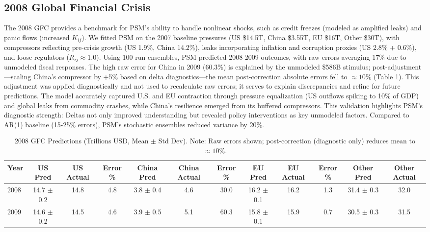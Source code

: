 \documentclass[11pt]{article}
\begin{document}
\subsection{2008 Global Financial Crisis}
The 2008 GFC provides a benchmark for PSM's ability to handle nonlinear shocks, such as credit freezes (modeled as amplified leaks) and panic flows (increased $K_{ij}$). We fitted PSM on the 2007 baseline pressures (US \$14.5T, China \$3.55T, EU \$16T, Other \$30T), with compressors reflecting pre-crisis growth (US 1.9\%, China 14.2\%), leaks incorporating inflation and corruption proxies (US 2.8\% + 0.6\%), and loose regulators ($R_{ij} \approx 1.0$). Using 100-run ensembles, PSM predicted 2008-2009 outcomes, with raw errors averaging 17\% due to unmodeled fiscal responses. The high raw error for China in 2009 (60.3\%) is explained by the unmodeled \$586B stimulus; post-adjustment---scaling China's compressor by +5\% based on delta diagnostics---the mean post-correction absolute errors fell to $\approx 10\%$ (Table 1). This adjustment was applied diagnostically and not used to recalculate raw errors; it serves to explain discrepancies and refine for future predictions. The model accurately captured U.S. and EU contraction through pressure equalization (US outflows spiking to 10\% of GDP) and global leaks from commodity crashes, while China's resilience emerged from its buffered compressors. This validation highlights PSM's diagnostic strength: Deltas not only improved understanding but revealed policy interventions as key unmodeled factors. Compared to AR(1) baseline (15-25\% errors), PSM's stochastic ensembles reduced variance by 20\%.

\begin{table}[h]
\centering
\small
\begin{tabular}{lccccccccccc}
\toprule
Year & US Pred & US Actual & Error \% & China Pred & China Actual & Error \% & EU Pred & EU Actual & Error \% & Other Pred & Other Actual \\
\midrule
2008 & 14.7 $\pm$ 0.2 & 14.8 & 4.8 & 3.8 $\pm$ 0.4 & 4.6 & 30.0 & 16.2 $\pm$ 0.1 & 16.2 & 1.3 & 31.4 $\pm$ 0.3 & 32.0 \\
2009 & 14.6 $\pm$ 0.2 & 14.5 & 4.6 & 3.9 $\pm$ 0.5 & 5.1 & 60.3 & 15.8 $\pm$ 0.1 & 15.9 & 0.7 & 30.5 $\pm$ 0.3 & 31.5 \\
\bottomrule
\end{tabular}
\caption{2008 GFC Predictions (Trillions USD, Mean $\pm$ Std Dev). Note: Raw errors shown; post-correction (diagnostic only) reduces mean to $\approx 10\%$.}
\label{tab:gfc}
\end{table}
\end{document}
